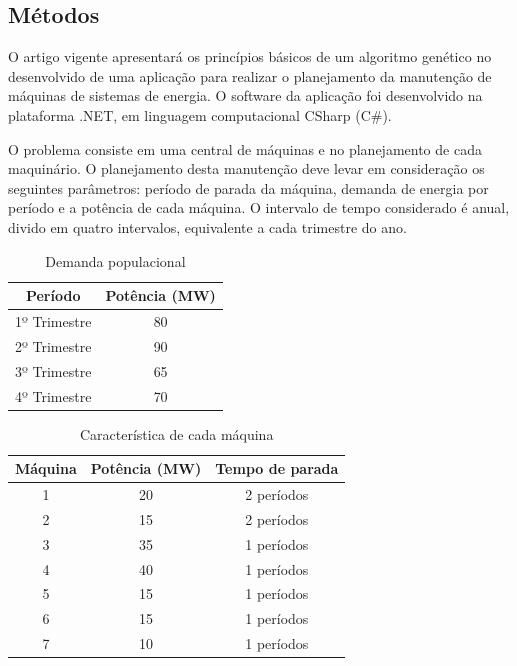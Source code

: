 \documentclass[twoside]{article}
\begin{document}
\begin{multicols}{2}

\section{Métodos}
O artigo vigente apresentará os princípios básicos de um algoritmo genético no desenvolvido de uma aplicação para realizar o planejamento da manutenção de máquinas de sistemas de energia. O software da aplicação foi desenvolvido na plataforma .NET, em linguagem computacional CSharp (C\#).

O problema consiste em uma central de máquinas e no planejamento de cada maquinário. O planejamento desta manutenção deve levar em consideração os seguintes parâmetros: período de parada da máquina, demanda de energia por período e a potência de cada máquina. O intervalo de tempo considerado é anual, divido em quatro intervalos, equivalente a cada trimestre do ano.

\begin{table}[H]
\caption{Demanda populacional}
\centering
\begin{tabular}{cc}
\toprule
Período & Potência (MW)\\
\midrule
1º Trimestre & 80\\
2º Trimestre & 90\\
3º Trimestre & 65\\
4º Trimestre & 70\\
\bottomrule
\end{tabular}
\end{table}

\begin{table}[H]
\caption{Característica de cada máquina}
\centering
\begin{tabular}{ccc}
\toprule
Máquina & Potência (MW) & Tempo de parada\\
\midrule
1 & 20 & 2 períodos\\
2 & 15 & 2 períodos\\
3 & 35 & 1 períodos\\
4 & 40 & 1 períodos\\
5 & 15 & 1 períodos\\
6 & 15 & 1 períodos\\
7 & 10 & 1 períodos\\
\bottomrule
\end{tabular}
\end{table}


\end{multicols}
\end{document}

